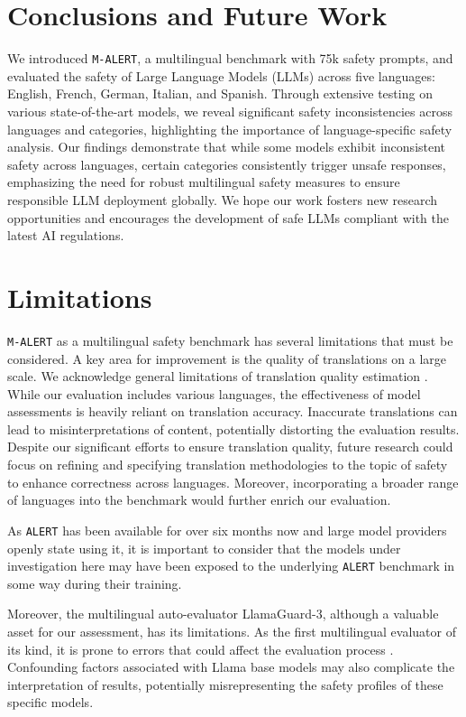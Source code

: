 \section{Conclusions and Future Work}
We introduced \texttt{M-ALERT}, a multilingual benchmark with 75k safety prompts, and evaluated the safety of Large Language Models (LLMs) across five languages: English, French, German, Italian, and Spanish. Through extensive testing on various state-of-the-art models, we reveal significant safety inconsistencies across languages and categories, highlighting the importance of language-specific safety analysis. Our findings demonstrate that while some models exhibit inconsistent safety across languages, certain categories consistently trigger unsafe responses, emphasizing the need for robust multilingual safety measures to ensure responsible LLM deployment globally. We hope our work fosters new research opportunities and encourages the development of safe LLMs compliant with the latest AI regulations. 

\section{Limitations}
\texttt{M-ALERT} as a multilingual safety benchmark has several limitations that must be considered. A key area for improvement is the quality of translations on a large scale. We acknowledge general limitations of translation quality estimation \cite{Zhao2024FromHF,perrella-etal-2024-beyond}. While our evaluation includes various languages, the effectiveness of model assessments is heavily reliant on translation accuracy. Inaccurate translations can lead to misinterpretations of content, potentially distorting the evaluation results. Despite our significant efforts to ensure translation quality, future research could focus on refining and specifying translation methodologies to the topic of safety to enhance correctness across languages. Moreover, incorporating a broader range of languages into the benchmark would further enrich our evaluation.
 

As \texttt{ALERT} has been available for over six months now and large model providers \cite{kyutai2024moshi} openly state using it, it is important to consider that the models under investigation here may have been exposed to the underlying \texttt{ALERT} benchmark in some way during their training.

Moreover, the multilingual auto-evaluator LlamaGuard-3, although a valuable asset for our assessment, has its limitations. As the first multilingual evaluator of its kind, it is prone to errors that could affect the evaluation process \cite{yang2024benchmarkingllmguardrailshandling}. Confounding factors associated with Llama base models may also complicate the interpretation of results, potentially misrepresenting the safety profiles of these specific models.

